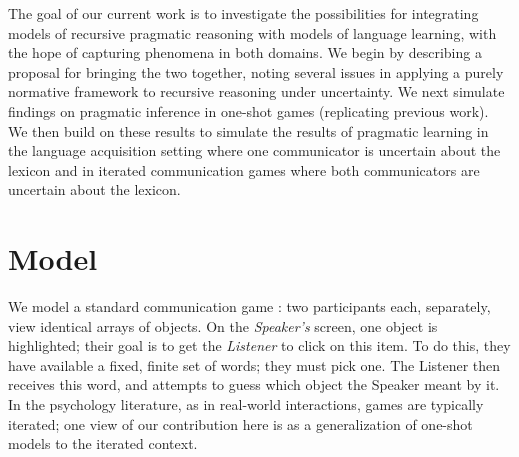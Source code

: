 \documentclass{article} %
\begin{document}

The goal of our current work is to investigate the possibilities for
integrating models of recursive pragmatic reasoning with models of
language learning, with the hope of capturing phenomena in both
domains. We begin by describing a proposal for bringing the two together, noting several issues in applying a purely normative framework to recursive reasoning under uncertainty. We next simulate findings
on pragmatic inference in one-shot games (replicating previous
work). We then build on these results to simulate the results of pragmatic
learning in the language acquisition setting where one communicator is
uncertain about the lexicon and in iterated communication games where both
communicators are uncertain about the lexicon. 






% 


\section{Model}

We model a standard communication game \cite{krauss1964,clark1986}:
two participants each, separately, view identical arrays of
objects. On the \textit{Speaker's} screen, one object is highlighted;
their goal is to get the \textit{Listener} to click on this item. To
do this, they have available a fixed, finite set of words; they must
pick one. The Listener then receives this word, and attempts to guess
which object the Speaker meant by it. In the psychology literature, as
in real-world interactions, games are typically iterated; one view of
our contribution here is as a generalization of one-shot models
\cite{frank2012,bergen2012} to the iterated context.
\end{document}
